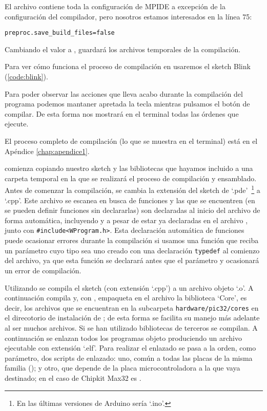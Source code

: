 El archivo  contiene toda la configuración de MPIDE a excepción de la configuración del compilador, pero nosotros estamos interesados en la línea 75:
\begin{lstlisting}
preproc.save_build_files=false
\end{lstlisting}

Cambiando el valor a ,  guardará los archivos temporales de la compilación.

Para ver cómo funciona el proceso de compilación en  usaremos el sketch Blink (\ref{code:blink}).

Para poder observar las acciones que lleva acabo  durante la compilación del programa podemos mantaner apretada la tecla  mientras pulsamos el botón de compilar. De esta forma  nos mostrará en el terminal todas las órdenes que ejecute.


El proceso completo de compilación (lo que se muestra en el terminal) está en el Apéndice \ref{chap:apendice1}.

 comienza copiando nuestro sketch y las bibliotecas que hayamos incluido a una carpeta temporal en la que se realizará el proceso de compilación y ensamblado. Antes de comenzar la compilación, se cambia la extensión del sketch de `.pde'~\footnote{En las últimas versiones de Arduino sería `.ino'.} a `.cpp'. Este archivo se escanea en busca de funciones y las que se encuentren (en  se pueden definir funciones sin declararlas) son declaradas al inicio del archivo de forma automática, incluyendo  y  a pesar de estar ya declaradas en el archivo , junto con \verb|#include<WProgram.h>|. Esta declaración automática de funciones puede ocasionar errores durante la compilación si usamos una función que reciba un parámetro cuyo tipo sea uno creado con una declaración \verb|typedef| al comienzo del archivo, ya que esta función se declarará antes que el parámetro y ocasionará un error de compilación.

Utilizando  se compila el sketch (con extensión `.cpp') a un archivo objeto `.o'. A continuación compila y, con , empaqueta en el archivo  la biblioteca `Core', es decir, los archivos que se encuentran en la subcarpeta \verb|hardware/pic32/cores| en el direcotorio de instalación de ; de esta forma se facilita su manejo más adelante al ser muchos archivos. Si se han utilizado bibliotecas de terceros se compilan. A continuación se enlazan todos los programas objeto produciendo un archivo ejecutable con extensión `.elf'. Para realizar el enlazado se pasa a la orden, como parámetro, dos scripts de enlazado: uno, común a todas las placas de la misma familia (); y otro, que depende de la placa microcontroladora a la que vaya destinado; en el caso de Chipkit Max32 es .


